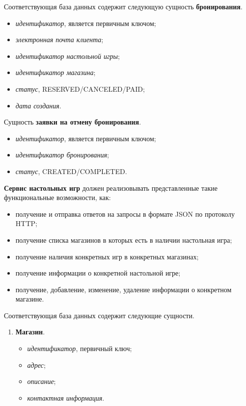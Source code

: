 Соответствующая база данных содержит следующую сущность \textbf{бронирования}.
\begin{itemize}[label=---]
\item \textit{идентификатор}, является первичным ключом;
\item \textit{электронная почта клиента};
\item \textit{идентификатор настольной игры};
\item \textit{идентификатор магазина};
\item \textit{статус}, RESERVED/CANCELED/PAID;
\item \textit{дата создания}.
\end{itemize}

Сущность \textbf{заявки на отмену бронирования}.
\begin{itemize}[label=---]
	\item \textit{идентификатор}, является первичным ключом;
	\item \textit{идентификатор бронирования};
	\item \textit{статус}, CREATED/COMPLETED.
\end{itemize}
\textbf{Сервис настольных игр} должен реализовывать представленные такие функциональные возможности, как:
\begin{itemize}
	\item получение и отправка ответов на запросы в формате JSON по протоколу HTTP;
	
	\item получение списка магазинов в которых есть в наличии настольная игра;
	
	\item получение наличия конкретных игр в конкретных магазинах;
	
	\item получение информации о конкретной настольной игре;
	
	\item получение, добавление, изменение, удаление информации о конкретном магазине.
\end{itemize}
Соответствующая база данных содержит следующие сущности.

\begin{enumerate}
	\item \textbf{Магазин}.
	\begin{itemize}[label=---]
		\item \textit{идентификатор}, первичный ключ;
		\item \textit{адрес};
		\item \textit{описание};
		\item \textit{контактная информация}.
	\end{itemize}
\end{enumerate}

